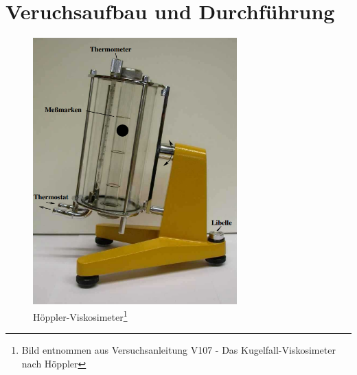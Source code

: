 \section{Veruchsaufbau und Durchführung}
\label{sec:Veruchsaufbau}

\begin{figure}[htbp]
    \centering
    \includegraphics[width=0.7\textwidth]{bilder/hoeppler_viskosimeter.png}
    \caption{Höppler-Viskosimeter\footnote[1]{Bild entnommen aus Versuchsanleitung V107 - Das Kugelfall-Viskosimeter nach Höppler}}
    \label{fig:hoeppler}
\end{figure}

